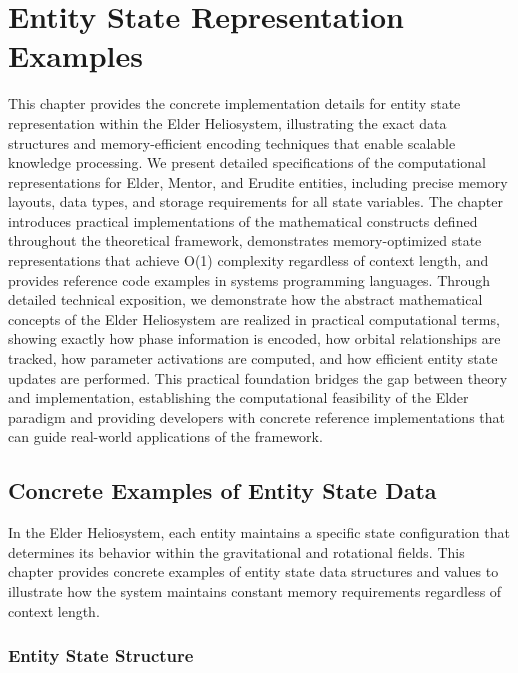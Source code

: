 \chapter{Entity State Representation Examples}

\begin{tcolorbox}[colback=PureBlue!5!white,colframe=PureBlue!75!black,title=Chapter Summary]
This chapter provides the concrete implementation details for entity state representation within the Elder Heliosystem, illustrating the exact data structures and memory-efficient encoding techniques that enable scalable knowledge processing. We present detailed specifications of the computational representations for Elder, Mentor, and Erudite entities, including precise memory layouts, data types, and storage requirements for all state variables. The chapter introduces practical implementations of the mathematical constructs defined throughout the theoretical framework, demonstrates memory-optimized state representations that achieve O(1) complexity regardless of context length, and provides reference code examples in systems programming languages. Through detailed technical exposition, we demonstrate how the abstract mathematical concepts of the Elder Heliosystem are realized in practical computational terms, showing exactly how phase information is encoded, how orbital relationships are tracked, how parameter activations are computed, and how efficient entity state updates are performed. This practical foundation bridges the gap between theory and implementation, establishing the computational feasibility of the Elder paradigm and providing developers with concrete reference implementations that can guide real-world applications of the framework.
\end{tcolorbox}

\section{Concrete Examples of Entity State Data}

In the Elder Heliosystem, each entity maintains a specific state configuration that determines its behavior within the gravitational and rotational fields. This chapter provides concrete examples of entity state data structures and values to illustrate how the system maintains constant memory requirements regardless of context length.

\subsection{Entity State Structure}

